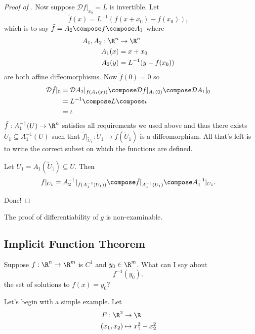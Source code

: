 \documentclass[a4paper]{article}
\newcommand*{\D}{\mathcal{D}}
\theoremstyle{definition}
\begin{document}
\begin{proof}[Proof of ]
  Now suppose \(\D f|_{x_0} = L\) is invertible. Let
  \[
    \tilde f(x) = L^{-1}(f(x + x_0) - f(x_0)),
  \]
  which is to say \(\tilde f = A_2 \compose f \compose A_1\) where
  \begin{align*}
    A_1, A_2: \R^n &\to \R^n \\
    A_1(x) &= x + x_0 \\
    A_2(y) &= L^{-1}(y - f(x_0))
  \end{align*}
  are both affine diffeomorphisms. Now \(\tilde f(0) = 0\) so
  \begin{align*}
    \D \tilde f|_0 &= \D A_2|_{f(A_1(x))} \compose \D f|_{A_1(0)} \compose \D A_1|_0 \\
                   &= L^{-1} \compose L \compose \iota \\
                   &= \iota
  \end{align*}
  \(\tilde f: A_1^{-1}(U) \to \R^n\) satisfies all requirements we used above and thus there exists \(\widetilde U_1 \subseteq A_1^{-1}(U)\) such that \(\tilde f|_{\widetilde U_1}: \widetilde U_1 \to \tilde f(\widetilde U_1)\) is a diffeomorphism. All that's left is to write the correct subset on which the functions are defined.

  Let \(U_1 = A_1(\widetilde U_1) \subseteq U\). Then
  \[
    f|_{U_1} = A_2^{-1}|_{\tilde f(A_1^{-1}(U_1))} \compose \tilde f|_{A_1^{-1}(U_1)} \compose A_1^{-1}|_{U_1}.
  \]

  Done!
\end{proof}

\begin{remark}
  The proof of differentiability of \(g\) is non-examinable.
\end{remark}

\subsection{Implicit Function Theorem}

\begin{question}
  Suppose \(f: \R^n \to \R^m\) is \(C^1\) and \(y_0 \in \R^m\). What can I say about
  \[
    f^{-1}(y_0),
  \]
  the set of solutions to \(f(x) = y_0\)?
\end{question}

Let's begin with a simple example. Let
\begin{align*}
  F: \R^2 &\to \R \\
  (x_1, x_2) &\mapsto x_1^2 - x_2^2
\end{align*}
\end{document}

